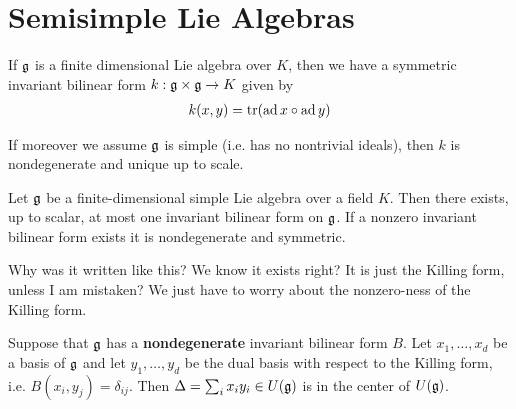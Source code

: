 \documentclass[12pt]{article}
\begin{document}
\section{Semisimple Lie Algebras}
\begin{proposition}
    If $\mathfrak{g}$ is a finite dimensional Lie algebra over $K$, then we have a symmetric invariant bilinear form $k:\mathfrak{g}\times\mathfrak{g}\to K$ given by \begin{align*}
        k(x,y) = \operatorname{tr}(\operatorname{ad} x \circ \operatorname{ad} y)
    \end{align*}
\end{proposition}
\begin{proposition}
    If moreover we assume $\mathfrak{g}$ is simple (i.e. has no nontrivial ideals), then $k$ is nondegenerate and unique up to scale.
\end{proposition}
\begin{proposition}
Let $\mathfrak{g}$ be a finite-dimensional simple Lie algebra over a field $K$. Then there exists, up to scalar, at most one invariant bilinear form on $\mathfrak{g}$. If a nonzero invariant bilinear form exists it is nondegenerate and symmetric.
\end{proposition}
Why was it written like this? We know it exists right? It is just the Killing form, unless I am mistaken? We just have to worry about the nonzero-ness of the Killing form.
\begin{proposition}
Suppose that $\mathfrak{g}$ has a \textbf{nondegenerate} invariant bilinear form $B$. Let $x_1,\dots,x_d$ be a basis of $\mathfrak{g}$ and let $y_1,\dots,y_d$ be the dual basis with respect to the Killing form, i.e. $B(x_i,y_j) = \delta_{ij}$. Then $\Delta = \sum_{i}x_iy_i\in U(\mathfrak{g})$ is in the center of $U(\mathfrak{g})$.
\end{proposition}
\end{document}
